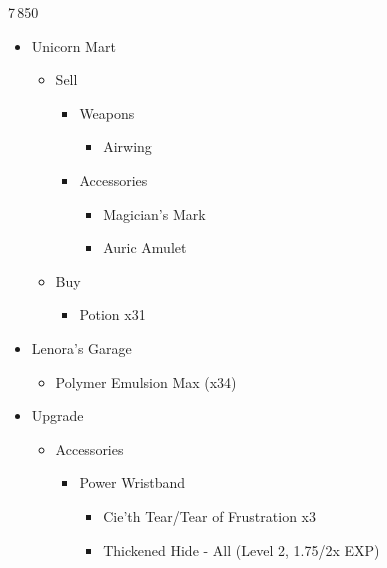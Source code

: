 \begin{multicols}{2}
\renewcommand{\first}{[1] Slash \& Burn (\com/\rav)}
\renewcommand{\second}{[2] Tide Turner (\syn/\sab)}
\renewcommand{\third}{[3] Divide \& Conquer (\com/\sab)}
\renewcommand{\fourth}{[4] Dualcasting (\rav/\rav)}

\begin{shop}{7\,850}
\begin{itemize}
    \item Unicorn Mart
    \begin{itemize}
        \item Sell
        \begin{itemize}
            \item Weapons
            \begin{itemize}
                \item Airwing
            \end{itemize}
            \item Accessories
            \begin{itemize}
                \item Magician's Mark
                \item Auric Amulet
            \end{itemize}
        \end{itemize}
        \item Buy
		\begin{itemize}
			\item Potion x31
		\end{itemize}
    \end{itemize}
    \item Lenora's Garage
	\begin{itemize}
		\item Polymer Emulsion Max (x34)
	\end{itemize}
\end{itemize}
\end{shop}
\begin{upgrade}
\begin{itemize}
    \item Upgrade
    \begin{itemize}
        \item Accessories
        \begin{itemize}
            \item Power Wristband
            \begin{itemize}
                \item Cie'th Tear/Tear of Frustration x3
                \item Thickened Hide - All (Level 2, 1.75/2x EXP)

\end{itemize}
\end{itemize}
\end{itemize}
\end{itemize}
\end{upgrade}
\end{multicols}
